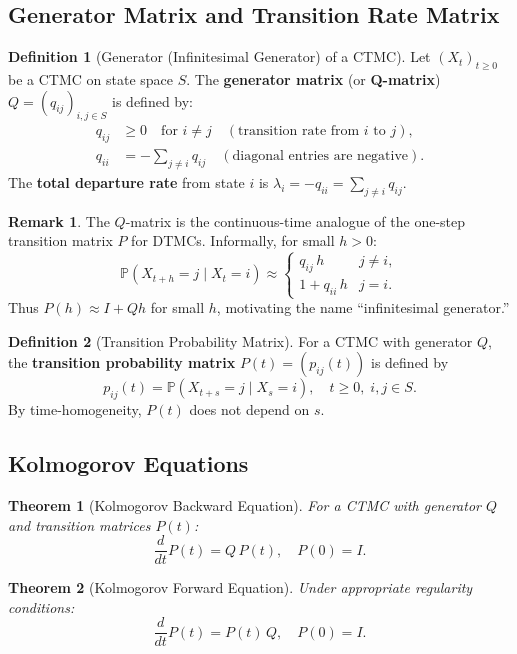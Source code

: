 \documentclass[12pt, a4paper]{article}
\theoremstyle{definition}
\newtheorem{definition}{Definition}[section]
\newtheorem{remark}{Remark}[section]
\theoremstyle{plain}
\newtheorem{theorem}{Theorem}[section]
\newcommand{\PP}{\mathbb{P}}
\begin{document}
\subsection{Generator Matrix and Transition Rate Matrix}

\begin{definition}[Generator (Infinitesimal Generator) of a CTMC]
Let $(X_t)_{t\ge 0}$ be a CTMC on state space $S$. The \textbf{generator matrix} (or \textbf{Q-matrix}) $Q=(q_{ij})_{i,j\in S}$ is defined by:
\begin{align*}
  q_{ij} &\ge 0 \quad \text{for } i\ne j \quad (\text{transition rate from } i \text{ to } j),\\
  q_{ii} &= -\sum_{j\ne i} q_{ij} \quad (\text{diagonal entries are negative}).
\end{align*}
The \textbf{total departure rate} from state $i$ is $\lambda_i = -q_{ii} = \sum_{j\ne i} q_{ij}$.
\end{definition}

\begin{remark}
The $Q$-matrix is the continuous-time analogue of the one-step transition matrix $P$ for DTMCs. Informally, for small $h>0$:
\[
  \PP(X_{t+h}=j \mid X_t=i) \approx \begin{cases} q_{ij}\,h & j\ne i,\\ 1 + q_{ii}\,h & j=i. \end{cases}
\]
Thus $P(h) \approx I + Qh$ for small $h$, motivating the name ``infinitesimal generator.''
\end{remark}

\begin{definition}[Transition Probability Matrix]
For a CTMC with generator $Q$, the \textbf{transition probability matrix} $P(t) = (p_{ij}(t))$ is defined by
\[
  p_{ij}(t) = \PP(X_{t+s}=j \mid X_s=i), \quad t\ge 0, \; i,j\in S.
\]
By time-homogeneity, $P(t)$ does not depend on $s$.
\end{definition}

\subsection{Kolmogorov Equations}

\begin{theorem}[Kolmogorov Backward Equation]
For a CTMC with generator $Q$ and transition matrices $P(t)$:
\[
  \frac{d}{dt} P(t) = Q\,P(t), \quad P(0) = I.
\]
\end{theorem}

\begin{theorem}[Kolmogorov Forward Equation]
Under appropriate regularity conditions:
\[
  \frac{d}{dt} P(t) = P(t)\,Q, \quad P(0) = I.
\]
\end{theorem}
\end{document}
